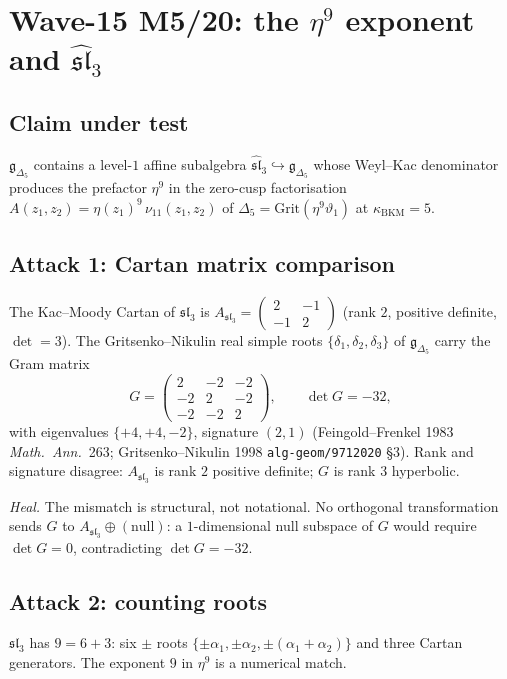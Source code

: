 \documentclass[12pt]{article}
\providecommand{\gDelta}{\mathfrak{g}_{\Delta_5}}
\providecommand{\slhat}[1]{\widehat{\mathfrak{sl}}_{#1}}
\providecommand{\sl}[1]{\mathfrak{sl}_{#1}}
\providecommand{\kBKM}{\kappa_{\mathrm{BKM}}}
\begin{document}
\section*{Wave-15 M5/20: the $\eta^9$ exponent and $\slhat{3}$}

\subsection*{Claim under test}

$\mathfrak{g}_{\Delta_5}$ contains a level-$1$ affine subalgebra
$\slhat{3} \hookrightarrow \gDelta$ whose Weyl--Kac denominator
produces the prefactor $\eta^9$ in the zero-cusp factorisation
$A(z_1,z_2) = \eta(z_1)^9\,\nu_{11}(z_1,z_2)$ of
$\Delta_5 = \mathrm{Grit}(\eta^9 \vartheta_1)$ at $\kBKM = 5$.

\subsection*{Attack 1: Cartan matrix comparison}

The Kac--Moody Cartan of $\sl{3}$ is $A_{\sl{3}} =
\begin{pmatrix} 2 & -1 \\ -1 & 2 \end{pmatrix}$ (rank $2$,
positive definite, $\det = 3$). The
Gritsenko--Nikulin real simple roots $\{\delta_1,\delta_2,\delta_3\}$
of $\gDelta$ carry the Gram matrix
\[
  G = \begin{pmatrix} 2 & -2 & -2 \\ -2 & 2 & -2 \\ -2 & -2 & 2 \end{pmatrix},
  \qquad \det G = -32,
\]
with eigenvalues $\{+4,+4,-2\}$, signature $(2,1)$
(Feingold--Frenkel 1983 \emph{Math.\ Ann.}~263; Gritsenko--Nikulin
1998 \texttt{alg-geom/9712020} \S3). Rank and signature
disagree: $A_{\sl{3}}$ is rank $2$ positive definite; $G$ is
rank $3$ hyperbolic.

\emph{Heal.} The mismatch is structural, not notational. No
orthogonal transformation sends $G$ to $A_{\sl{3}} \oplus
(\text{null})$: a $1$-dimensional null subspace of $G$ would
require $\det G = 0$, contradicting $\det G = -32$.

\subsection*{Attack 2: counting roots}

$\sl{3}$ has $9 = 6 + 3$: six $\pm$ roots
$\{\pm\alpha_1,\pm\alpha_2,\pm(\alpha_1+\alpha_2)\}$ and three
Cartan generators. The exponent $9$ in $\eta^9$ is a numerical
match.
\end{document}
